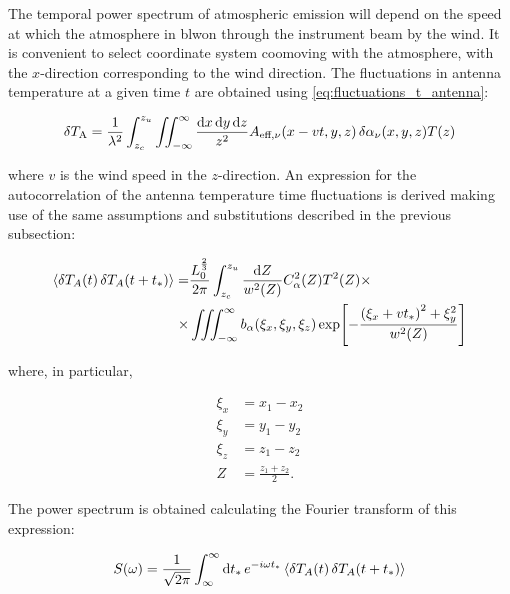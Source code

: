 The temporal power spectrum of atmospheric emission will depend on the
speed at which the atmosphere in blwon through the instrument beam by the
wind. It is convenient to select coordinate system coomoving with the
atmosphere, with the $x$-direction corresponding to the wind direction. The
fluctuations in antenna temperature at a given time $t$ are obtained using
\autoref{eq:fluctuations_t_antenna}:

\begin{equation}
        \var{T_\text{A}} = \frac{1}{\lambda^2} \int^{z_u}_{z_c}
        \iint^\infty_{-\infty} \frac{\dd{x}\dd{y}\dd{z}}{z^2}
        A_{\text{eff},\nu}\qty(x - vt,y,z)
        \var{\alpha_\nu\qty(x,y,z) T\qty(z)}
\end{equation}

where $v$ is the wind speed in the $z$-direction. An expression for the
autocorrelation of the antenna temperature time fluctuations is derived
making use of the same assumptions and substitutions described in the
previous subsection:

\begin{equation}
        \begin{split}
                \expval{\var{T_A\qty(t)}\var{T_A\qty(t + t_*)}} = &
                \frac{L^{\frac{2}{3}}_0}{2\pi} \int^{z_u}_{z_c}
                \frac{\dd{Z}}{w^2\qty(Z)} C^2_\alpha\qty(Z)T^2\qty(Z) \times
                \\ \times
                & \iiint^\infty_{-\infty} b_\alpha\qty(\xi_x,\xi_y,\xi_z)
                \exp[-\frac{\qty(\xi_x + vt_*)^2 + \xi^2_y}{w^2\qty(Z)}]
        \end{split}
\end{equation}

where, in particular,

\begin{align}
         \xi_x & = x_1 - x_2 \\
         \xi_y & = y_1 - y_2 \\
         \xi_z & = z_1 - z_2 \\
         Z & = \frac{z_1 + z_2}{2}.
\end{align}

The power spectrum is obtained calculating the Fourier transform of this
expression:

\begin{equation}
        S\qty(\omega) = \frac{1}{\sqrt{2\pi}} \int^\infty_\infty \dd{t_*}
        e^{-i\omega t_*} \expval{\var{T_A\qty(t)}\var{T_A\qty(t + t_*)}}
\end{equation}

